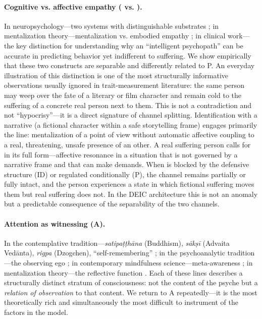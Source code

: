 \paragraph{Cognitive vs. affective empathy (\Ecog{} vs. \EAF{}).}
In neuropsychology---two systems with distinguishable substrates \citep{shamaytsoory2011, decety2011}; in mentalization theory---mentalization vs. embodied empathy \citep{fonagy2002}; in clinical work---the key distinction for understanding why an ``intelligent psychopath'' can be accurate in predicting behavior yet indifferent to suffering. We show empirically that these two constructs are separable and differently related to P. An everyday illustration of this distinction is one of the most structurally informative observations usually ignored in trait-measurement literature: the same person may weep over the fate of a literary or film character and remain cold to the suffering of a concrete real person next to them. This is not a contradiction and not ``hypocrisy''---it is a direct signature of channel splitting. Identification with a narrative (a fictional character within a safe storytelling frame) engages primarily the \Ecog{} line: mentalization of a point of view without automatic affective coupling to a real, threatening, unsafe presence of an other. A real suffering person calls for \EAF{} in its full form---affective resonance in a situation that is not governed by a narrative frame and that can make demands. When \EAF{} is blocked by the defensive structure (ID) or regulated conditionally (P), the \Ecog{} channel remains partially or fully intact, and the person experiences a state in which fictional suffering moves them but real suffering does not. In the DEIC architecture this is not an anomaly but a predictable consequence of the separability of the two channels.

\paragraph{Attention as witnessing (A).}
In the contemplative tradition---\textit{satipa\d{t}\d{t}h\=ana} (Buddhism), \textit{s\=ak\d{s}\=i} (Advaita Ved\=anta), \textit{rigpa} (Dzogchen), ``self-remembering'' \citep[Gurdjieff through][]{ouspensky1949}; in the psychoanalytic tradition---the observing ego \citep{sterba1934, kris1956}; in contemporary mindfulness science---meta-awareness \citep{dunne2011, josipovic2014}; in mentalization theory---the reflective function \citep{fonagy1997}. Each of these lines describes a structurally distinct stratum of consciousness: not the content of the psyche but a \emph{relation of observation} to that content. We return to A repeatedly---it is the most theoretically rich and simultaneously the most difficult to instrument of the factors in the model.

